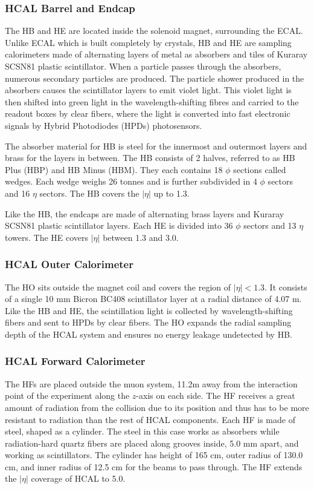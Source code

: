 \subsubsection{HCAL Barrel and Endcap}
The HB and HE are located inside the solenoid magnet, surrounding the ECAL. Unlike ECAL which is built completely by crystals, HB and HE are sampling calorimeters made of alternating layers of metal as absorbers and tiles of Kuraray SCSN81 plastic scintillator. When a particle passes through the absorbers, numerous secondary particles are produced. The particle shower produced in the absorbers causes the scintillator layers to emit violet light. This violet light is then shifted into green light in the wavelength-shifting fibres and carried to the readout boxes by clear fibers, where the light is converted into fast electronic signals by Hybrid Photodiodes (HPDs) photosensors.

\vspace{0.3cm}
The absorber material for HB is steel for the innermost and outermost layers and brass for the layers in between. The HB consists of 2 halves, referred to as HB Plus (HBP) and HB Minus (HBM). They each contains 18 $\phi$ sections called wedges. Each wedge weighs 26 tonnes and is further subdivided in 4 $\phi$ sectors and 16 $\eta$ sectors. The HB covers the $|\eta|$ up to 1.3.

\vspace{0.3cm}
Like the HB, the endcaps are made of alternating brass layers and Kuraray SCSN81 plastic scintillator layers. Each HE is divided into 36 $\phi$ sectors and 13 $\eta$ towers. The HE covers $|\eta|$ between 1.3 and 3.0.

\subsubsection{HCAL Outer Calorimeter}
The HO sits outside the magnet coil and covers the region of $|\eta|<1.3$. It consists of a single 10 mm Bicron BC408 scintillator layer at a radial distance of 4.07 m. Like the HB and HE, the scintillation light is collected by wavelength-shifting fibers and sent to HPDs by clear fibers. The HO expands the radial sampling depth of the HCAL system and ensures no energy leakage undetected by HB.

\subsubsection{HCAL Forward Calorimeter}
The HFs are placed outside the muon system, 11.2m away from the interaction point of the experiment along the $z$-axis on each side. The HF receives a great amount of radiation from the collision due to its position and thus has to be more resistant to radiation than the rest of HCAL components. Each HF is made of steel, shaped as a cylinder. The steel in this case works as absorbers while radiation-hard quartz fibers are placed along grooves inside, 5.0 mm apart, and working as scintillators. The cylinder has height of 165 cm, outer radius of 130.0 cm, and inner radius of 12.5 cm for the beams to pass through. The HF extends the $|\eta|$ coverage of HCAL to 5.0.


